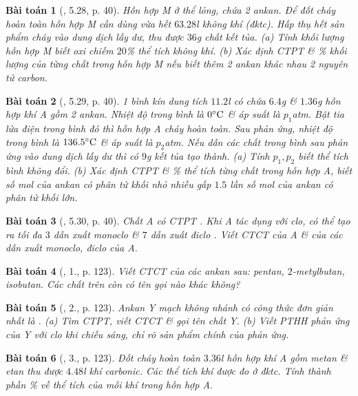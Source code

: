 \documentclass{article}
\newtheorem{baitoan}{Bài toán}
\begin{document}
\begin{baitoan}[\cite{SBT_Hoa_Hoc_11_co_ban}, 5.28, p. 40]
	Hỗn hợp M ở thể lỏng, chứa 2 ankan. Để đốt cháy hoàn toàn hỗn hợp M cần dùng vừa hết $63.28$\emph{l} không khí (đktc). Hấp thụ hết sản phẩm cháy vào dung dịch \emph{} lấy dư, thu được $36$\emph{g} chất kết tủa. (a) Tính khối lượng hỗn hợp M biết oxi chiếm $20$\% thể tích không khí. (b) Xác định CTPT \& \% khối lượng của từng chất trong hỗn hợp M nếu biết thêm 2 ankan khác nhau 2 nguyên tử carbon.
\end{baitoan}

\begin{baitoan}[\cite{SBT_Hoa_Hoc_11_co_ban}, 5.29, p. 40]
	1 bình kín dung tích $11.2$\emph{l} có chứa $6.4$\emph{g} \emph{} \& $1.36$\emph{g} hỗn hợp khí A gồm 2 ankan. Nhiệt độ trong bình là $0^\circ{\rm C}$ \& áp suất là $p_1$\emph{atm}. Bật tia lửa điện trong bình đó thì hỗn hợp A cháy hoàn toàn. Sau phản ứng, nhiệt độ trong bình là $136.5^\circ{\rm C}$ \& áp suất là $p_2$\emph{atm}. Nếu dẫn các chất trong bình sau phản ứng vào dung dịch \emph{} lấy dư thì có $9$\emph{g} kết tủa tạo thành. (a) Tính $p_1,p_2$ biết thể tích bình không đổi. (b) Xác định CTPT \& \% thể tích từng chất trong hỗn hợp A, biết số mol của ankan có phân tử khối nhỏ nhiều gấp $1.5$ lần số mol của ankan có phân tử khối lớn.
\end{baitoan}

\begin{baitoan}[\cite{SBT_Hoa_Hoc_11_co_ban}, 5.30, p. 40]
	Chất A có CTPT \emph{}. Khi A tác dụng với clo, có thể tạo ra tối đa $3$ dẫn xuất monoclo \emph{} \& $7$ dẫn xuất điclo \emph{}. Viết CTCT của A \& của các dẫn xuất monoclo, điclo của A.
\end{baitoan}

\begin{baitoan}[\cite{SGK_Hoa_Hoc_11_co_ban}, 1., p. 123]
	Viết CTCT của các ankan sau: pentan, $2$-metylbutan, isobutan. Các chất trên còn có tên gọi nào khác không?
\end{baitoan}

\begin{baitoan}[\cite{SGK_Hoa_Hoc_11_co_ban}, 2., p. 123]
	Ankan Y mạch không nhánh có công thức đơn giản nhất là \emph{}. (a) Tìm CTPT, viết CTCT \& gọi tên chất Y. (b) Viết PTHH phản ứng của Y với clo khi chiếu sáng, chỉ rõ sản phẩm chính của phản ứng.
\end{baitoan}

\begin{baitoan}[\cite{SGK_Hoa_Hoc_11_co_ban}, 3., p. 123]
	Đốt cháy hoàn toàn $3.36$\emph{l} hỗn hợp khí A gồm metan \& etan thu được $4.48$\emph{l} khí carbonic. Các thể tích khí được đo ở đktc. Tính thành phần \% về thể tích của mỗi khí trong hỗn hợp A.
\end{baitoan}
\end{document}
